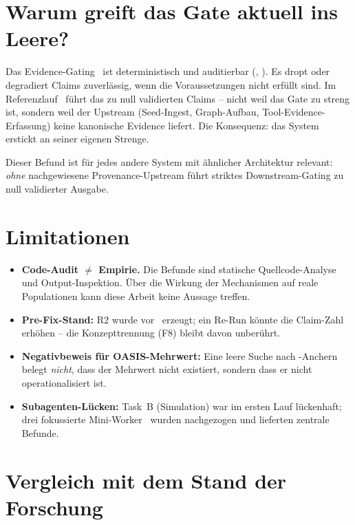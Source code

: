 \section{Warum greift das Gate aktuell ins Leere?}\label{sec:gate-leer}

Das Evidence-Gating~\cite{adr-0002} ist deterministisch und auditierbar (, ). Es dropt oder degradiert Claims zuverl{\"a}ssig, wenn die Voraussetzungen nicht erf{\"u}llt sind. Im Referenzlauf~\cite{audit-r2} f{\"u}hrt das zu null validierten Claims -- nicht weil das Gate zu streng ist, sondern weil der Upstream (Seed-Ingest, Graph-Aufbau, Tool-Evidence-Erfassung) keine kanonische Evidence liefert. Die Konsequenz: das System erstickt an seiner eigenen Strenge.

Dieser Befund ist f{\"u}r jedes andere System mit {\"a}hnlicher Architektur relevant: \emph{ohne} nachgewiesene Provenance-Upstream f{\"u}hrt striktes Downstream-Gating zu null validierter Ausgabe.

\section{Limitationen}\label{sec:limitationen}

\begin{itemize}
  \item \textbf{Code-Audit $\neq$ Empirie.} Die Befunde sind statische Quellcode-Analyse und Output-Inspektion. {\"U}ber die Wirkung der Mechanismen auf reale Populationen kann diese Arbeit keine Aussage treffen.
  \item \textbf{Pre-Fix-Stand:} R2 wurde vor~ erzeugt; ein Re-Run k{\"o}nnte die Claim-Zahl erh{\"o}hen -- die Konzepttrennung (F8) bleibt davon unber{\"u}hrt.
  \item \textbf{Negativbeweis f{\"u}r OASIS-Mehrwert:} Eine leere Suche nach -Anchern belegt \emph{nicht}, dass der Mehrwert nicht existiert, sondern dass er nicht operationalisiert ist.
  \item \textbf{Subagenten-L{\"u}cken:} Task~B (Simulation) war im ersten Lauf l{\"u}ckenhaft; drei fokussierte Mini-Worker~ wurden nachgezogen und lieferten zentrale Befunde.
\end{itemize}

\section{Vergleich mit dem Stand der Forschung}\label{sec:vergleich-forschung}

